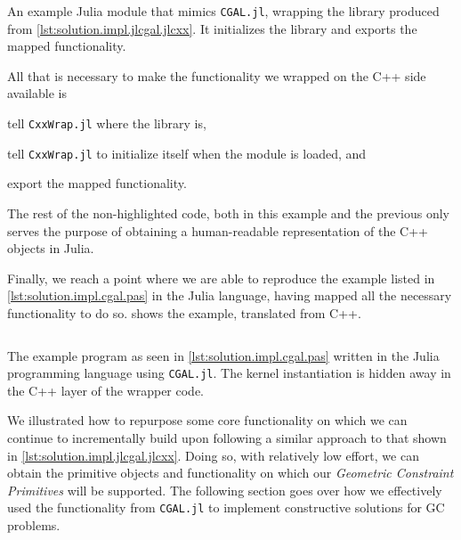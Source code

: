 \begin{listing}[htbp]
  \inputminted[highlightlines={4-6,8,9}]{julia}{jl/CGAL.jl} 
  \caption[Bare-bones Julia module wrapping some of CGAL]{
    An example Julia module that mimics \texttt{CGAL.jl}, wrapping the library
    produced from \cref{lst:solution.impl.jlcgal.jlcxx}.  It initializes the
    library and exports the mapped functionality.}%
  \label{lst:solution.impl.jlcgal.cgal}
\end{listing}

All that is necessary to make the functionality we wrapped on the C++ side
available is
\begin{enumerate*}[label= (\arabic*)]
  \item tell \texttt{CxxWrap.jl} where the library is,
  \item tell \texttt{CxxWrap.jl} to initialize itself when the module is loaded,
  and
  \item export the mapped functionality.
\end{enumerate*}
The rest of the non-highlighted code, both in this example and the previous
only serves the purpose of obtaining a human-readable representation of the C++
objects in Julia.

Finally, we reach a point where we are able to reproduce the example listed in
\cref{lst:solution.impl.cgal.pas} in the Julia language, having mapped all the
necessary functionality to do so.   shows the
example, translated from C++.

\begin{listing}[htbp]
  \inputminted{julia}{jl/points_and_segments.jl}
  \caption[CGAL.jl: Three points and one segment]{
    The example program as seen in \cref{lst:solution.impl.cgal.pas} written in
    the Julia programming language using \texttt{CGAL.jl}.  The kernel
    instantiation is hidden away in the C++ layer of the wrapper code.}%
  \label{lst:solution.impl.jlcgal.pas}
\end{listing}

We illustrated how to repurpose some core functionality on which we can continue
to incrementally build upon following a similar approach to that shown in
\cref{lst:solution.impl.jlcgal.jlcxx}.  Doing so, with relatively low effort, we
can obtain the primitive objects and functionality on which our
\textit{Geometric Constraint Primitives} will be supported.  The following
section goes over how we effectively used the functionality from
\texttt{CGAL.jl} to implement constructive solutions for \ac{GC} problems.
